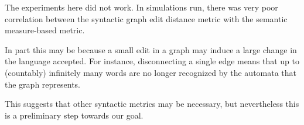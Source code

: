 The experiments here did not work.
In simulations run,
there was very poor correlation between the syntactic graph edit distance
metric with the semantic measure-based metric.

In part this may be because a small edit in a graph may induce a large
change in the language accepted.
For instance, disconnecting a single edge
means that up to (countably) infinitely many words are no longer
recognized by the automata that the graph represents.

This suggests that other syntactic metrics may be necessary,
but nevertheless this is a preliminary step towards
our goal.





